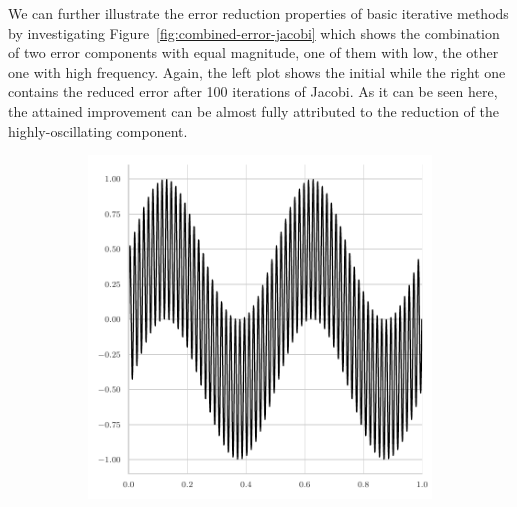 We can further illustrate the error reduction properties of basic iterative methods by investigating Figure~\ref{fig:combined-error-jacobi} which shows the combination of two error components with equal magnitude, one of them with low, the other one with high frequency.
Again, the left plot shows the initial while the right one contains the reduced error after 100 iterations of Jacobi.
As it can be seen here, the attained improvement can be almost fully attributed to the reduction of the highly-oscillating component.
\begin{figure}
	\begin{subfigure}[b]{0.45\textwidth}
	\centering
		\includegraphics[width=\textwidth]{figures/initial_error_jacobi_combined.pdf}
\end{subfigure}
\hfill
\begin{subfigure}[b]{0.45\textwidth}
	\centering

\end{subfigure}
\end{figure}
